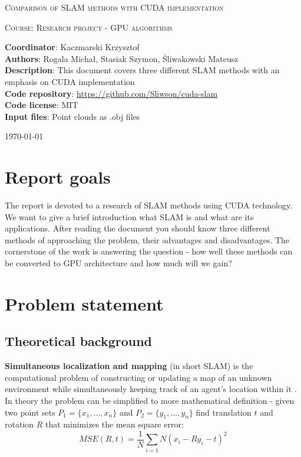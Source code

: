 \documentclass[titlepage]{article}
\begin{document}
\begin{titlepage}
	{\centering
	{\scshape\huge Comparison of SLAM methods with CUDA implementation \par}
	\vspace{1cm}
	{\scshape\Large Course: Research project - GPU algorithms \par}}
	
	\vspace{1cm}
	\noindent\textbf{Coordinator}: Kaczmarski Krzysztof\\
	\textbf{Authors}: Rogala Michał, Stasiak Szymon, Śliwakowski Mateusz\\
	\textbf{Description}: This document covers three different SLAM methods with an emphasis on CUDA \mbox{implementation}\\
	\textbf{Code repository}: \href{https://github.com/Sliwson/cuda-slam}{https://github.com/Sliwson/cuda-slam}\\
	\textbf{Code license}: MIT\\
	\textbf{Input files}: Point clouds as .obj files\\

	\vfill
	{\large \today \par}
\end{titlepage}

\tableofcontents
\newpage

\section{Report goals}

The report is devoted to a research of SLAM methods using CUDA technology. We want to give a brief introduction what SLAM is and what are its applications. After reading the document you should know three different methods of approaching the problem, their advantages and disadvantages. The cornerstone of the work is answering the question - how well these methods can be converted to GPU architecture and how much will we gain?

\section{Problem statement}

\subsection{Theoretical background}
\label{sec:theory}
\textbf{Simultaneous localization and mapping} (in short SLAM) is the computational problem of constructing or updating a map of an unknown environment while simultaneously keeping track of an agent's location within it \cite{ms-wiki1}. In theory the problem can be simplified to more mathematical definition - given two point sets $P_1 = \{x_1,\dots, x_n\}$ and $P_2=\{y_1, \dots, y_n\}$ find translation $t$ and rotation $R$ that minimizes the mean square error:
$$MSE(R, t) = \frac{1}{N}\sum_{i=1}{N}(x_i - Ry_i - t)^2$$
\end{document}
